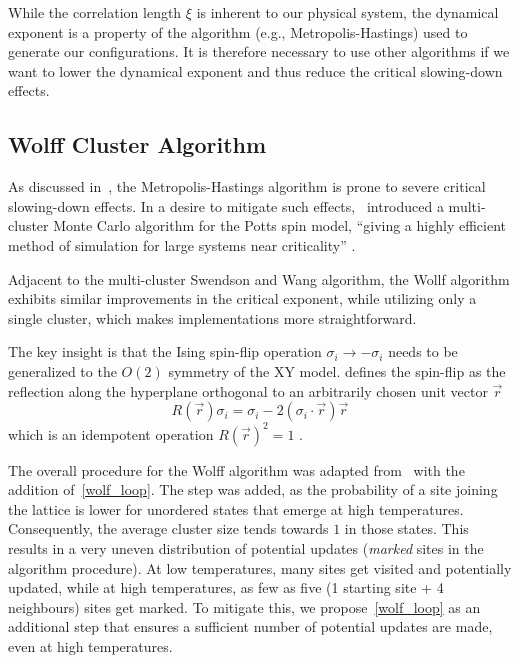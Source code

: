		While the correlation length $\xi$ is inherent to our physical system, the dynamical exponent is a property of the algorithm (e.g., Metropolis-Hastings) used to generate our configurations. It is therefore necessary to use other algorithms if we want to lower the dynamical exponent and thus reduce the critical slowing-down effects.
		
	\subsection{Wolff Cluster Algorithm}\label{sec:theo:wolff_cluster}
		As discussed in~, the Metropolis-Hastings algorithm is prone to severe critical slowing-down effects. In a desire to mitigate such effects,~\cite{sw} introduced a multi-cluster Monte Carlo algorithm for the Potts spin model, \enquote{giving a highly efficient method of simulation for large systems near criticality} \cite[p. 86]{sw}.
		
		Adjacent to the multi-cluster Swendson and Wang algorithm, the Wollf algorithm exhibits similar improvements in the critical exponent, while utilizing only a single cluster, which makes implementations more straightforward.
		
		The key insight is that the Ising spin-flip operation $\sigma_i \rightarrow -\sigma_i$ needs to be generalized to the $O(2)$ symmetry of the XY model. \cite{wolff} defines the spin-flip as the reflection along the hyperplane orthogonal to an arbitrarily chosen unit vector $\vec{r}$
		\begin{equation}
			R(\vec{r}) \sigma_i = \sigma_i - 2 (\sigma_i \cdot \vec{r}) \vec{r} 
		\end{equation}
		which is an idempotent operation $R(\vec{r})^2=1$ \cite[eq. 3]{wolff}.
	
		The overall procedure for the Wolff algorithm was adapted from~\citet[p. 361]{wolff} with the addition of~\cref{wolf_loop}. The step was added, as the probability of a site joining the lattice is lower for unordered states that emerge at high temperatures. Consequently, the average cluster size tends towards $1$ in those states. This results in a very uneven distribution of potential updates (\emph{marked} sites in the algorithm procedure). At low temperatures, many sites get visited and potentially updated, while at high temperatures, as few as five (1 starting site + 4 neighbours) sites get marked. To mitigate this, we propose~\cref{wolf_loop} as an additional step that ensures a sufficient number of potential updates are made, even at high temperatures.
		
